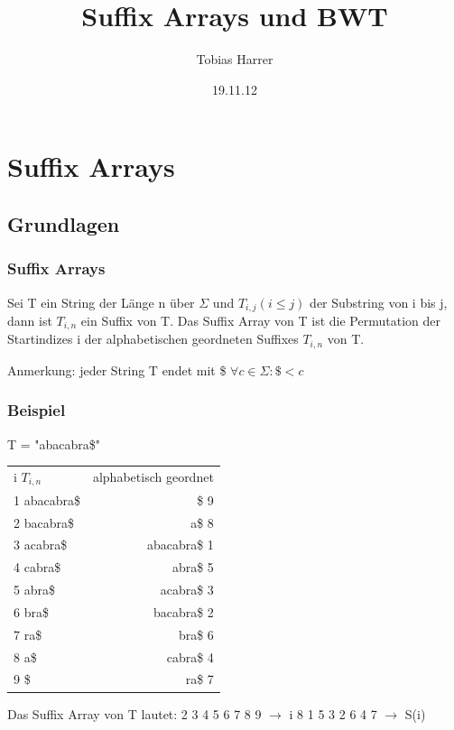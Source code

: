 \documentclass{beamer}
\title{Suffix Arrays und BWT}
\author{Tobias Harrer}
\date{19.11.12}
\begin{document}
\maketitle
\frame{\tableofcontents[currentsection]}
 
\section{Suffix Arrays}
\subsection{Grundlagen}
\begin{frame} %
  \frametitle{Suffix Arrays} %
  \begin{Definition} %
    Sei T ein String der L\"ange n \"uber $\Sigma$ und $T_{i,j} (i\leq j)$ der Substring von i bis j, dann ist $T_{i,n}$ ein Suffix von T. Das Suffix Array von T ist die Permutation der Startindizes i der alphabetischen geordneten Suffixes $T_{i,n}$ von T.
  \end{Definition}
  Anmerkung: jeder String T endet mit \$ \newline
  $\forall c \in \Sigma : \$ < c$
\end{frame}
\begin{frame}
\frametitle{Beispiel} %
T = "abacabra\$"\newline
	\begin{tabular}{l r}
	i $T_{i,n}$ & alphabetisch geordnet\\
1 abacabra\$ & \$ 9\\
2 bacabra\$ & a\$ 8\\
3 acabra\$ & abacabra\$ 1\\
4 cabra\$ & abra\$ 5\\
5 abra\$ & acabra\$ 3\\
6 bra\$ & bacabra\$ 2\\
7 ra\$ & bra\$ 6\\
8 a\$ & cabra\$ 4\\
9 \$ & ra\$ 7\\
	\end{tabular}
	\newline
	Das Suffix Array von T lautet:  2 3 4 5 6 7 8 9 $\rightarrow$ i 8 1 5 3 2 6 4 7 $\rightarrow$ S(i)
\end{frame}
\end{document}
